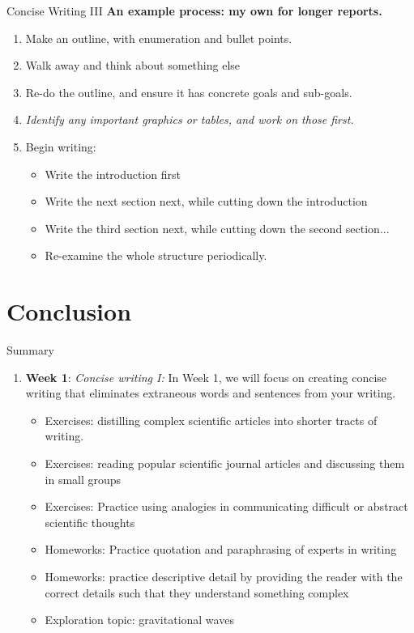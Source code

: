 \documentclass{beamer}
\begin{document}
\begin{frame}{Concise Writing III}
\textbf{An example process: my own for longer reports.}
\begin{enumerate}
\item Make an outline, with enumeration and bullet points.
\item Walk away and think about something else
\item Re-do the outline, and ensure it has concrete goals and sub-goals.
\item \textit{Identify any important graphics or tables, and work on those first.}
\item Begin writing:
\begin{itemize}
\item Write the introduction first
\item Write the next section next, while cutting down the introduction
\item Write the third section next, while cutting down the second section...
\item Re-examine the whole structure periodically.
\end{itemize}
\end{enumerate}
\end{frame}

\section{Conclusion}

\begin{frame}{Summary}
\begin{enumerate}
\item \textbf{Week 1}: \textit{Concise writing I:} In Week 1, we will focus on creating concise writing that eliminates extraneous words and sentences from your writing.
\begin{itemize}
\item Exercises: distilling complex scientific articles into shorter tracts of writing.
\item Exercises: reading popular scientific journal articles and discussing them in small groups
\item Exercises: Practice using analogies in communicating difficult or abstract scientific thoughts
\item Homeworks: Practice quotation and paraphrasing of experts in writing
\item Homeworks: practice descriptive detail by providing the reader with the correct details such that they understand something complex
\item Exploration topic: gravitational waves
\end{itemize}
\end{enumerate}
\end{frame}
\end{document}
